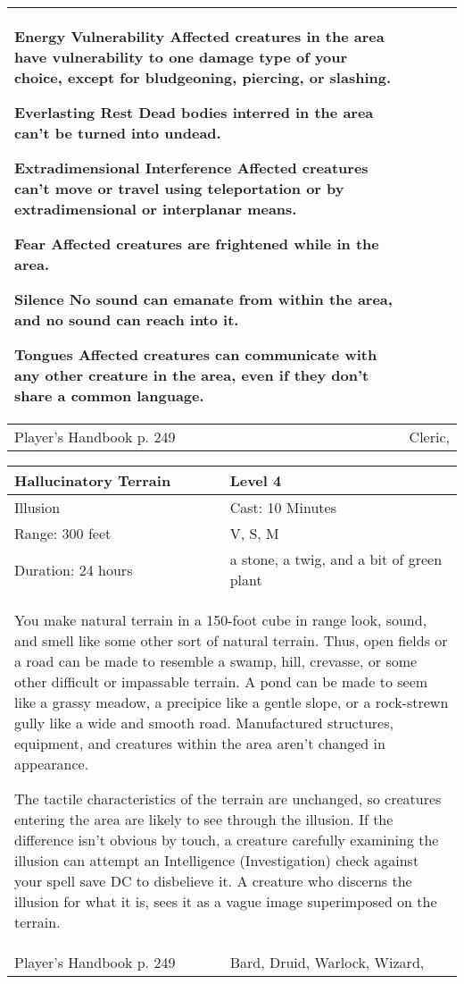 \documentclass[11pt]{report}
\begin{document}
\begin{table}[H]
\begin{tabular}{||p{6cm}|p{6cm}||}
{Energy Vulnerability
Affected creatures in the area have vulnerability to one damage type of your choice, except for bludgeoning, piercing, or slashing.

Everlasting Rest
Dead bodies interred in the area can’t be turned into undead.

Extradimensional Interference
Affected creatures can’t move or travel using teleportation or by extradimensional or interplanar means.

Fear
Affected creatures are frightened while in the area.

Silence
No sound can emanate from within the area, and no sound can reach into it.

Tongues
Affected creatures can communicate with any other creature in the area, even if they don’t share a common language.}\\ \hline
Player's Handbook p. 249 & Cleric, \\ \hline\hline
	\end{tabular}
\end{table}

\begin{table}[H]
	\begin{tabular}{||p{6cm}|p{6cm}||}
		\hline\hline
		\bf{Hallucinatory Terrain} & Level 4\\ \hline
		Illusion & Cast: 10 Minutes\\ \hline
		Range: 300 feet & V, S, M\\ \hline
		Duration: 24 hours & a stone, a twig, and a bit of green plant\\ \hline
		\multicolumn{2}{||p{12cm}||}{You make natural terrain in a 150-foot cube in range look, sound, and smell like some other sort of natural terrain. Thus, open fields or a road can be made to resemble a swamp, hill, crevasse, or some other difficult or impassable terrain. A pond can be made to seem like a grassy meadow, a precipice like a gentle slope, or a rock-strewn gully like a wide and smooth road. Manufactured structures, equipment, and creatures within the area aren’t changed in appearance.

The tactile characteristics of the terrain are unchanged, so creatures entering the area are likely to see through the illusion. If the difference isn’t obvious by touch, a creature carefully examining the illusion can attempt an Intelligence (Investigation) check against your spell save DC to disbelieve it. A creature who discerns the illusion for what it is, sees it as a vague image superimposed on the terrain.}\\ \hline
Player's Handbook p. 249 & Bard, Druid, Warlock, Wizard, \\ \hline\hline
	\end{tabular}
\end{table}
\end{document}

